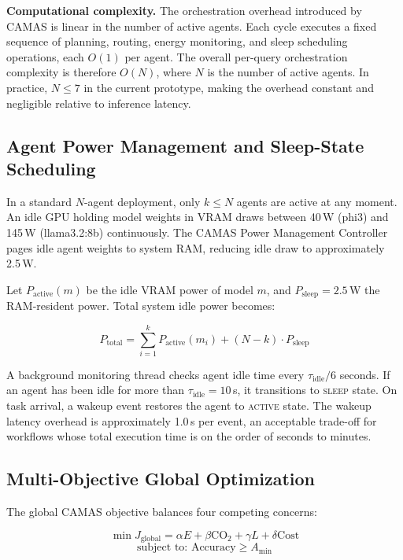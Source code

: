 \documentclass[journal]{IEEEtran}
\begin{document}
\textbf{Computational complexity.} The orchestration overhead introduced by
CAMAS is linear in the number of active agents. Each cycle executes a fixed
sequence of planning, routing, energy monitoring, and sleep scheduling
operations, each $O(1)$ per agent. The overall per-query orchestration
complexity is therefore $O(N)$, where $N$ is the number of active agents.
In practice, $N \leq 7$ in the current prototype, making the overhead
constant and negligible relative to inference latency.

\subsection{Agent Power Management and Sleep-State Scheduling}

In a standard $N$-agent deployment, only $k \leq N$ agents are active at any
moment. An idle GPU holding model weights in VRAM draws between 40\,W (phi3)
and 145\,W (llama3.2:8b) continuously. The CAMAS Power Management Controller
pages idle agent weights to system RAM, reducing idle draw to approximately
2.5\,W.

Let $P_{\text{active}}(m)$ be the idle VRAM power of model $m$, and
$P_{\text{sleep}} = 2.5\,$W the RAM-resident power. Total system idle power
becomes:

\begin{equation}
    P_{\text{total}} = \sum_{i=1}^{k} P_{\text{active}}(m_i) + (N - k) \cdot P_{\text{sleep}}
    \label{eq:power}
\end{equation}

A background monitoring thread checks agent idle time every
$\tau_{\text{idle}}/6$ seconds. If an agent has been idle for more than
$\tau_{\text{idle}} = 10$\,s, it transitions to \textsc{sleep} state. On task
arrival, a wakeup event restores the agent to \textsc{active} state. The
wakeup latency overhead is approximately 1.0\,s per event, an acceptable
trade-off for workflows whose total execution time is on the order of seconds
to minutes.

\subsection{Multi-Objective Global Optimization}

The global CAMAS objective balances four competing concerns:

\begin{equation}
    \min J_{\text{global}} = \alpha E + \beta \text{CO}_2 + \gamma L + \delta \text{Cost}
    \label{eq:global}
\end{equation}
\begin{equation}
    \text{subject to: Accuracy} \geq A_{\min}
    \label{eq:global_constraint}
\end{equation}
\end{document}

